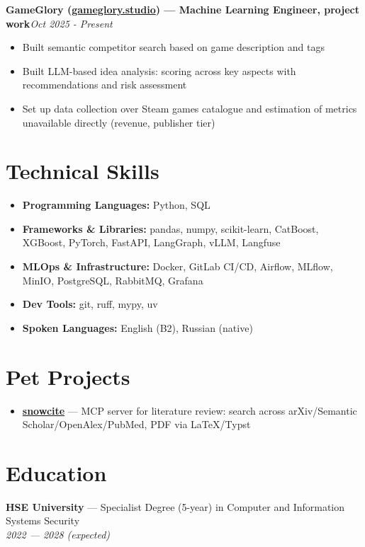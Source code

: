 \documentclass[a4paper,11pt]{article}
\begin{document}
\textbf{GameGlory (\href{https://gameglory.studio/}{gameglory.studio}) --- Machine Learning Engineer, project work}\hfill \textit{Oct 2025 - Present}

\begin{itemize}
  \item Built semantic competitor search based on game description and tags
  \item Built LLM-based idea analysis: scoring across key aspects with recommendations and risk assessment
  \item Set up data collection over Steam games catalogue and estimation of metrics unavailable directly (revenue, publisher tier)
\end{itemize}

\section*{Technical Skills}
\begin{itemize}
  \item \textbf{Programming Languages:} Python, SQL
  \item \textbf{Frameworks \& Libraries:} pandas, numpy, scikit-learn, CatBoost, XGBoost, PyTorch, FastAPI, LangGraph, vLLM, Langfuse
  \item \textbf{MLOps \& Infrastructure:} Docker, GitLab CI/CD, Airflow, MLflow, MinIO, PostgreSQL, RabbitMQ, Grafana
  \item \textbf{Dev Tools:} git, ruff, mypy, uv
  \item \textbf{Spoken Languages:} English (B2), Russian (native)
\end{itemize}

\section*{Pet Projects}
\begin{itemize}
  \item \href{https://github.com/cop1cat/snowcite}{\textbf{snowcite}} --- MCP server for literature review: search across arXiv/Semantic Scholar/OpenAlex/PubMed, PDF via LaTeX/Typst
\end{itemize}

\section*{Education}
\textbf{HSE University} --- Specialist Degree (5-year) in Computer and Information Systems Security\\
\textit{2022 --- 2028 (expected)}
\end{document}
